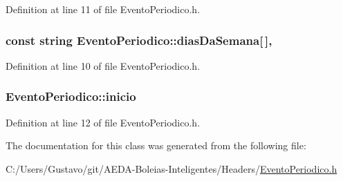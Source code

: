 Definition at line 11 of file Evento\+Periodico.\+h.

\hypertarget{class_evento_periodico_a65e4d98dbe59d5f63b67efdd4a350c16}{
\subsubsection[{dias\+Da\+Semana}]{\setlength{\rightskip}{0pt plus 5cm}const string Evento\+Periodico\+::dias\+Da\+Semana\mbox{[}$\,$\mbox{]}\hspace{0.3cm}{\ttfamily [static]}, {\ttfamily [private]}}}\label{class_evento_periodico_a65e4d98dbe59d5f63b67efdd4a350c16}


Definition at line 10 of file Evento\+Periodico.\+h.

\hypertarget{class_evento_periodico_a2ae3543393734dffa1d4d5e36484132e}{
\subsubsection[{inicio}]{ Evento\+Periodico\+::inicio\hspace{0.3cm}{\ttfamily [private]}}}\label{class_evento_periodico_a2ae3543393734dffa1d4d5e36484132e}


Definition at line 12 of file Evento\+Periodico.\+h.



The documentation for this class was generated from the following file\+:\begin{DoxyCompactItemize}
\item 
C\+:/\+Users/\+Gustavo/git/\+A\+E\+D\+A-\/\+Boleias-\/\+Inteligentes/\+Headers/\hyperlink{_evento_periodico_8h}{Evento\+Periodico.\+h}\end{DoxyCompactItemize}

